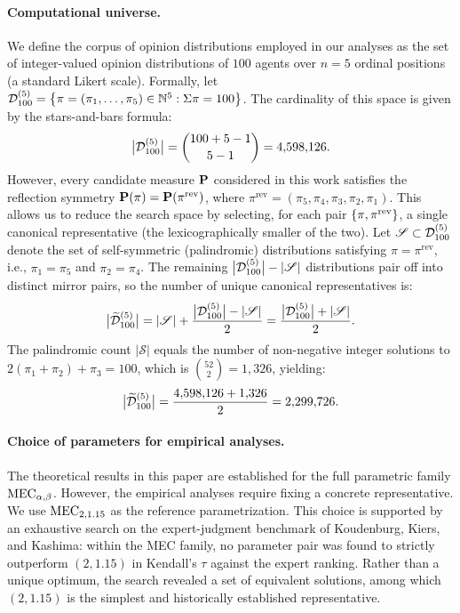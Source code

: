 \paragraph{Computational universe.}
We define the corpus of opinion distributions employed in our analyses as the set of integer-valued opinion distributions of $100$ agents over $n=5$ ordinal positions (a standard Likert scale). Formally, let $\mathcal{D}_{100}^{(5)} = \big\{ \pi=(\pi_1,\dots,\pi_5)\in\mathbb{N}^5 : \Sigma \pi = 100 \big\}$. The cardinality of this space is given by the stars-and-bars formula:
\[
\big|\mathcal{D}_{100}^{(5)}\big| = \binom{100+5-1}{5-1} = 4{,}598{,}126.
\]
However, every candidate measure $\mathbf{P}$ considered in this work satisfies the reflection symmetry $\mathbf{P}(\pi) = \mathbf{P}(\pi^{\text{rev}})$, where $\pi^{\text{rev}} = (\pi_5, \pi_4, \pi_3, \pi_2, \pi_1)$. This allows us to reduce the search space by selecting, for each pair $\set{\pi, \pi^{\text{rev}}}$, a single canonical representative (the lexicographically smaller of the two). Let $\mathscr{S} \subset \mathcal{D}_{100}^{(5)}$ denote the set of self-symmetric (palindromic) distributions satisfying $\pi = \pi^{\text{rev}}$, i.e., $\pi_1 = \pi_5$ and $\pi_2 = \pi_4$. The remaining $\big|\mathcal{D}_{100}^{(5)}\big| - |\mathscr{S}|$ distributions pair off into distinct mirror pairs, so the number of unique canonical representatives is:
\[
\big|\widetilde{\mathcal{D}}_{100}^{(5)}\big| = |\mathscr{S}| + \frac{\big|\mathcal{D}_{100}^{(5)}\big| - |\mathscr{S}|}{2} = \frac{\big|\mathcal{D}_{100}^{(5)}\big| + |\mathscr{S}|}{2}.
\]
The palindromic count $|\mathscr{S}|$ equals the number of non-negative integer solutions to $2(\pi_1 + \pi_2) + \pi_3 = 100$, which is $\binom{52}{2} = 1{,}326$, yielding:
\[
\big|\widetilde{\mathcal{D}}_{100}^{(5)}\big| = \frac{4{,}598{,}126 + 1{,}326}{2} = 2{,}299{,}726.
\]

\paragraph{Choice of parameters for empirical analyses.}
The theoretical results in this paper are established for the full parametric
family $\MEC$. However, the empirical analyses require fixing a concrete representative. We use $\MEC[2,1.15]$ as the
reference parametrization. This choice is supported by an exhaustive search on the expert-judgment
benchmark of Koudenburg, Kiers, and Kashima: within the MEC family, no parameter pair was found to strictly outperform
$(2,1.15)$ in Kendall's $\tau$ against the expert ranking. Rather than a unique
optimum, the search revealed a set of equivalent solutions, among which
$(2,1.15)$ is the simplest and historically established representative.


